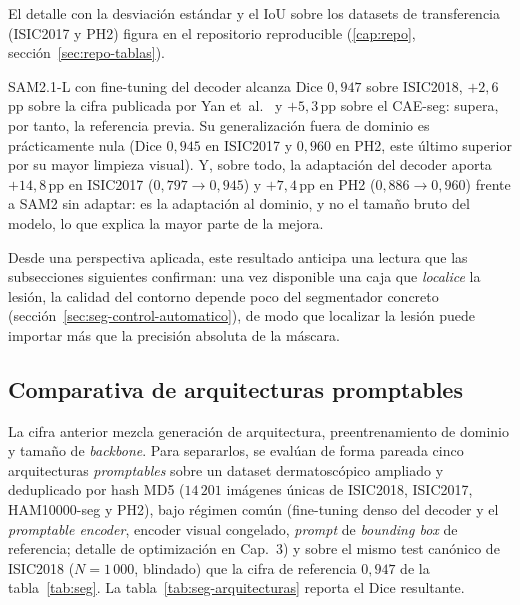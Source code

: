El detalle con la desviación estándar y el IoU sobre los datasets de
transferencia (ISIC2017 y PH2) figura en el repositorio reproducible
(\ref{cap:repo}, sección~\ref{sec:repo-tablas}).

SAM2.1-L con fine-tuning del decoder alcanza Dice
$0{,}947$ sobre ISIC2018, $+2{,}6$\,pp sobre la cifra publicada por
Yan et~al.~\cite{panderm2025} y $+5{,}3$\,pp sobre el CAE-seg: supera,
por tanto, la referencia previa. Su generalización fuera de dominio es
prácticamente nula (Dice $0{,}945$ en ISIC2017 y $0{,}960$ en PH2,
este último superior por su mayor limpieza visual). Y, sobre todo, la
adaptación del decoder aporta $+14{,}8$\,pp en ISIC2017
($0{,}797 \to 0{,}945$) y $+7{,}4$\,pp en PH2 ($0{,}886 \to 0{,}960$)
frente a SAM2 sin adaptar: es la adaptación al dominio, y no el tamaño
bruto del modelo, lo que explica la mayor parte de la mejora.

Desde una perspectiva aplicada, este resultado anticipa una lectura
que las subsecciones siguientes confirman: una vez disponible una caja
que \emph{localice} la lesión, la calidad del contorno depende poco
del segmentador concreto (sección~\ref{sec:seg-control-automatico}),
de modo que localizar la lesión puede importar más que la precisión
absoluta de la máscara.

\subsection{Comparativa de arquitecturas promptables}
\label{sec:seg-arquitecturas}

La cifra anterior mezcla generación de arquitectura, preentrenamiento
de dominio y tamaño de \emph{backbone}. Para separarlos, se evalúan de
forma pareada cinco arquitecturas \emph{promptables} sobre un dataset
dermatoscópico ampliado y deduplicado por hash MD5 ($14\,201$ imágenes
únicas de ISIC2018, ISIC2017, HAM10000-seg y PH2), bajo régimen común
(fine-tuning denso del decoder y el \emph{promptable
encoder}, encoder visual congelado, \emph{prompt} de \emph{bounding
box} de referencia; detalle de optimización en Cap.~3) y sobre el mismo
test canónico de ISIC2018 ($N = 1\,000$, blindado) que la cifra de
referencia $0{,}947$ de la tabla~\ref{tab:seg}. La
tabla~\ref{tab:seg-arquitecturas} reporta el Dice resultante.

